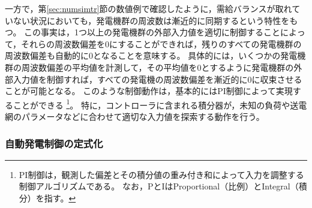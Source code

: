 \documentclass[tombow,dvipdfmx]{corona-a5}
\begin{document}
一方で，第\ref{sec:numsimtr}節の数値例で確認したように，需給バランスが取れていない状況においても，発電機群の周波数は漸近的に同期するという特性をもつ。
この事実は，1つ以上の発電機群の外部入力値を適切に制御することによって，それらの周波数偏差を0にすることができれば，残りのすべての発電機群の周波数偏差も自動的に0となることを意味する。
具体的には，いくつかの発電機群の周波数偏差の平均値を計測して，その平均値を0とするように発電機群の外部入力値を制御すれば，すべての発電機の周波数偏差を漸近的に0に収束させることが可能となる。
このような制御動作は，基本的にはPI制御によって実現することができる
\footnote{
PI制御は，観測した偏差とその積分値の重み付き和によって入力を調整する制御アルゴリズムである。
なお，PとIはProportional（比例）とIntegral（積分）を指す。
}。
特に，コントローラに含まれる積分器が，未知の負荷や送電網のパラメータなどに合わせて適切な入力値を探索する動作を行う。

\subsubsection{自動発電制御の定式化}
\end{document}
